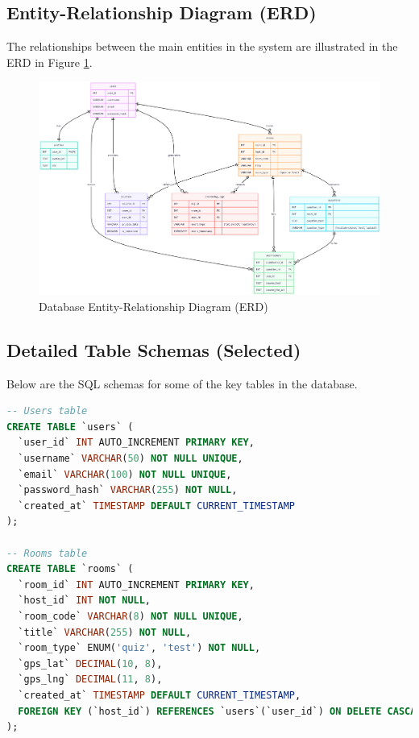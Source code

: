 \subsection{Entity-Relationship Diagram (ERD)}
The relationships between the main entities in the system are illustrated in the ERD in Figure \ref{fig:erd-diagram}.

\begin{figure}[htbp]
\centering
\includegraphics[width=\textwidth]{figures/erd-diagram.png}
\caption{Database Entity-Relationship Diagram (ERD)}
\label{fig:erd-diagram}
\end{figure}

\subsection{Detailed Table Schemas (Selected)}
Below are the SQL schemas for some of the key tables in the database.

\begin{lstlisting}[language=SQL, caption={SQL Schema for the `users` and `rooms` tables}]
-- Users table
CREATE TABLE `users` (
  `user_id` INT AUTO_INCREMENT PRIMARY KEY,
  `username` VARCHAR(50) NOT NULL UNIQUE,
  `email` VARCHAR(100) NOT NULL UNIQUE,
  `password_hash` VARCHAR(255) NOT NULL,
  `created_at` TIMESTAMP DEFAULT CURRENT_TIMESTAMP
);

-- Rooms table
CREATE TABLE `rooms` (
  `room_id` INT AUTO_INCREMENT PRIMARY KEY,
  `host_id` INT NOT NULL,
  `room_code` VARCHAR(8) NOT NULL UNIQUE,
  `title` VARCHAR(255) NOT NULL,
  `room_type` ENUM('quiz', 'test') NOT NULL,
  `gps_lat` DECIMAL(10, 8),
  `gps_lng` DECIMAL(11, 8),
  `created_at` TIMESTAMP DEFAULT CURRENT_TIMESTAMP,
  FOREIGN KEY (`host_id`) REFERENCES `users`(`user_id`) ON DELETE CASCADE
);
\end{lstlisting}

